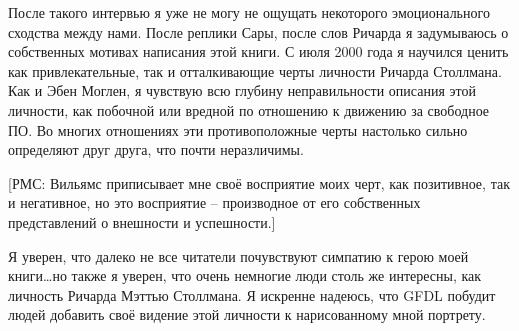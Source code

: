 После такого интервью я уже не могу не ощущать некоторого эмоционального сходства между нами. После реплики Сары, после слов Ричарда я задумываюсь о собственных мотивах написания этой книги. С июля 2000 года я научился ценить как привлекательные, так и отталкивающие черты личности Ричарда Столлмана. Как и Эбен Моглен, я чувствую всю глубину неправильности описания этой личности, как побочной или вредной по отношению к движению за свободное ПО. Во многих отношениях эти противоположные черты настолько сильно определяют друг друга, что почти неразличимы.

[РМС: Вильямс приписывает мне своё восприятие моих черт, как позитивное, так и негативное, но это восприятие -- производное от его собственных представлений о внешности и успешности.]

Я уверен, что далеко не все читатели почувствуют симпатию к герою моей книги\ldots но также я уверен, что очень немногие люди столь же интересны, как личность Ричарда Мэттью Столлмана. Я искренне надеюсь, что GFDL побудит людей добавить своё видение этой личности к нарисованному мной портрету.

\theendnotes
\setcounter{endnote}{0}
